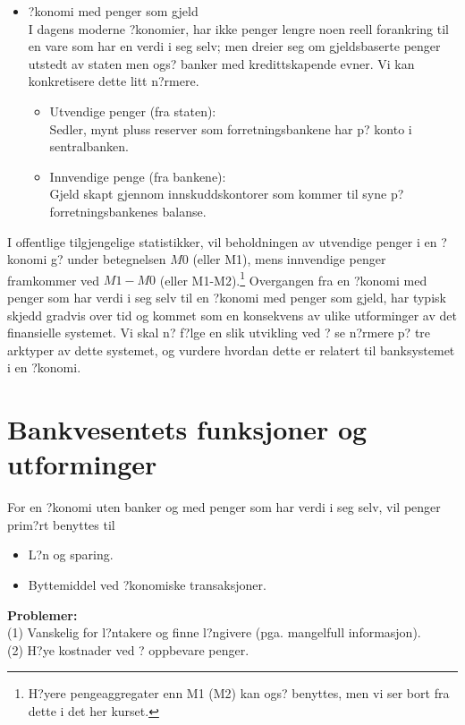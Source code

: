 \documentclass[a4paper,notitlepage]{article}
\begin{document}
\begin{itemize}
 \item ?konomi med penger som gjeld\\
I dagens moderne ?konomier, har ikke penger lengre noen reell forankring til en vare som har en verdi i seg selv; men dreier seg om gjeldsbaserte penger utstedt av staten men ogs? banker med kredittskapende evner. Vi kan konkretisere dette litt n?rmere.
\begin{itemize}
\item Utvendige penger (fra staten):\\
Sedler, mynt pluss reserver som forretningsbankene har p? konto i sentralbanken.
\item Innvendige penge (fra bankene):\\
Gjeld skapt gjennom innskuddskontorer som kommer til syne p? forretningsbankenes balanse.
\end{itemize}
\end{itemize}
I offentlige tilgjengelige statistikker, vil beholdningen av utvendige penger i en ?konomi g? under betegnelsen $M0$ (eller M1), mens innvendige penger framkommer ved $M1-M0$ (eller M1-M2).\footnote{H?yere pengeaggregater enn M1 (M2) kan ogs? benyttes, men vi ser bort fra dette i det her kurset.}
Overgangen fra en ?konomi med penger som har verdi i seg selv til en ?konomi med penger som gjeld, har typisk skjedd gradvis over tid og kommet som en konsekvens av ulike utforminger av det finansielle systemet. Vi skal n? f?lge en slik utvikling ved ? se n?rmere p? tre arktyper av dette systemet, og vurdere hvordan dette er relatert til banksystemet i en ?konomi.
\section{Bankvesentets funksjoner og utforminger}
For en ?konomi uten banker og med penger som har verdi i seg selv, vil penger prim?rt benyttes til
\begin{itemize}
\item L?n og sparing.
\item Byttemiddel ved ?konomiske transaksjoner.
\end{itemize}
\noindent\textbf{Problemer:}\\
(1) Vanskelig for l?ntakere og finne l?ngivere (pga. mangelfull informasjon).\\
(2) H?ye kostnader ved ? oppbevare penger. \\
\end{document}

